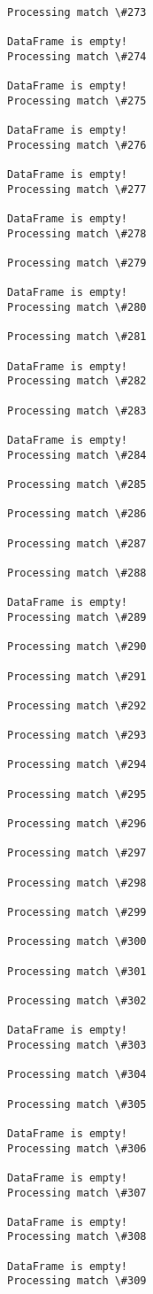\documentclass[11pt]{article}
\begin{document}
\begin{Verbatim}[commandchars=\\\{\}]
Processing match \#273

DataFrame is empty!
Processing match \#274

DataFrame is empty!
Processing match \#275

DataFrame is empty!
Processing match \#276

DataFrame is empty!
Processing match \#277

DataFrame is empty!
Processing match \#278

Processing match \#279

DataFrame is empty!
Processing match \#280

Processing match \#281

DataFrame is empty!
Processing match \#282

Processing match \#283

DataFrame is empty!
Processing match \#284

Processing match \#285

Processing match \#286

Processing match \#287

Processing match \#288

DataFrame is empty!
Processing match \#289

Processing match \#290

Processing match \#291

Processing match \#292

Processing match \#293

Processing match \#294

Processing match \#295

Processing match \#296

Processing match \#297

Processing match \#298

Processing match \#299

Processing match \#300

Processing match \#301

Processing match \#302

DataFrame is empty!
Processing match \#303

Processing match \#304

Processing match \#305

DataFrame is empty!
Processing match \#306

DataFrame is empty!
Processing match \#307

DataFrame is empty!
Processing match \#308

DataFrame is empty!
Processing match \#309


\end{Verbatim}
\end{document}
